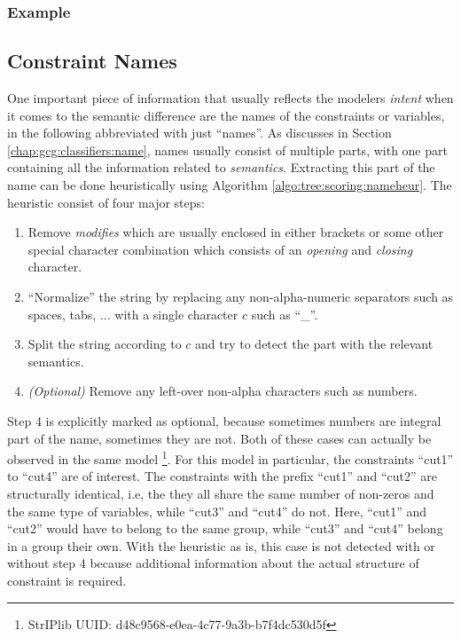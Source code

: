 		\clearpage
		
		\subsubsection{Example}
		
		
		\clearpage
	
		\subsection{Constraint Names}
		\label{chap:tree:scoring:names}
		
			One important piece of information that usually reflects the modelers \textit{intent} when it comes to the semantic difference are the names of the constraints or variables, in the following abbreviated with just \enquote{names}.
			As discusses in Section \ref{chap:gcg:classifiers:name}, names usually consist of multiple parts, with one part containing all the information related to \textit{semantics}.
			Extracting this part of the name can be done heuristically using Algorithm \ref{algo:tree:scoring:nameheur}.
			The heuristic consist of four major steps:
			\begin{enumerate}
				\item Remove \textit{modifies} which are usually enclosed in either brackets or some other special character combination which consists of an \textit{opening} and \textit{closing} character.
				\item \enquote{Normalize} the string by replacing any non-alpha-numeric separators such as spaces, tabs, $\ldots$ with a single character $c$ such as \enquote{\_}.
				\item Split the string according to $c$ and try to detect the part with the relevant semantics. 
				\item \textit{(Optional)} Remove any left-over non-alpha characters such as numbers.
			\end{enumerate}
			
			Step 4 is explicitly marked as optional, because sometimes numbers are integral part of the name, sometimes they are not.
			Both of these cases can actually be observed in the same model \footnote{StrIPlib UUID: d48c9568-e0ea-4c77-9a3b-b7f4dc530d5f}.
			For this model in particular, the constraints \enquote{cut1} to \enquote{cut4} are of interest.
			The constraints with the prefix \enquote{cut1} and \enquote{cut2} are structurally identical, i.e, the they all share the same number of non-zeros and the same type of variables, while \enquote{cut3} and \enquote{cut4} do not.
			Here, \enquote{cut1} and \enquote{cut2} would have to belong to the same group, while \enquote{cut3} and \enquote{cut4} belong in a group their own.
			With the heuristic as is, this case is not detected with or without step 4 because additional information about the actual structure of constraint is required.
			
